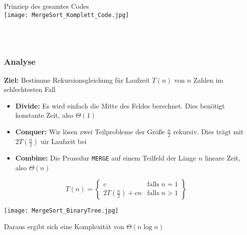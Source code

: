 			\begin{center}
				Prinziep des gesamtes Codes \\
				\texttt{[image: MergeSort\_Komplett\_Code.jpg]}
			\end{center}
			\mbox{} \\ \\
				
				
		\subsubsection{Analyse}
			\textbf{Ziel:} Bestimme Rekursionsgleichung für Laufzeit $T(n)$ von $n$ Zahlen im schlechtesten Fall
			\begin{itemize}
				\item \textbf{Divide:} Es wird einfach die Mitte des Feldes berechnet. Dies benötigt konstante Zeit, also $\Theta(1)$
				\item \textbf{Conquer:} Wir lösen zwei Teilprobleme der Grö\ss e $\frac{n}{2}$ rekursiv. Dies trägt mit $2T(\frac{n}{2})$ uir Laufzeit bei
				\item \textbf{Combine:} Die Prozedur \texttt{MERGE} auf einem Teilfeld der Länge $n$ lineare Zeit, also $\Theta(n)$
			\end{itemize}
				
			\begin{center}
				\[
					T(n) = \left\{\begin{array}{lr}
						c & \text{falls } n = 1 \\
						2T(\frac{n}{2}) + cn & \text{falls } n > 1 
					\end{array}\right\}
					\] \vspace{0.35cm}
						
					\texttt{[image: MergeSort\_BinaryTree.jpg]}
				\end{center}
					
				Daraus ergibt sich eine Komplexität von $\Theta(n \log n)$ \\
				
					
					
